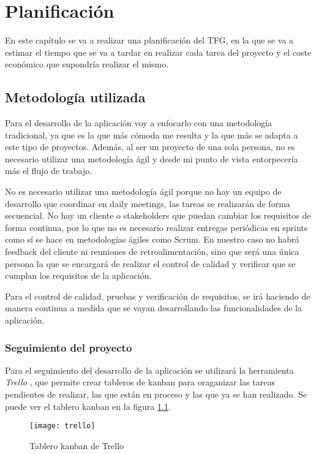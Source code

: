 \chapter{Planificación}
En este capítulo se va a realizar una planificación del TFG, en la que se
va a estimar el tiempo que se va a tardar en realizar cada tarea del proyecto
y el coste económico que supondría realizar el mismo.

\section{Metodología utilizada}
Para el desarrollo de la aplicación voy a enfocarlo con una metodología
tradicional, ya que es la que más cómoda me resulta y la que más se adapta
a este tipo de proyectos. Además, al ser un proyecto de una sola persona, no es
necesario utilizar una metodología ágil y desde mi punto de vista entorpecería
más el flujo de trabajo.

No es necesario utilizar una metodología ágil porque no hay un equipo de
desarrollo que coordinar en daily meetings, las tareas se realizarán de forma secuencial.
No hay un cliente o stakeholders que puedan cambiar los requisitos de forma
continua, por lo que no es necesario realizar entregas periódicas en sprints como
sí se hace en metodologías ágiles como Scrum. En nuestro caso no habrá feedback del
cliente ni reuniones de retroalimentación, sino que será una única persona la que
se encargará de realizar el control de calidad y verificar que se cumplan los
requisitos de la aplicación.

Para el control de calidad, pruebas y verificación de requisitos, se irá haciendo
de manera continua a medida que se vayan desarrollando las funcionalidades de la
aplicación.

\subsection{Seguimiento del proyecto}
Para el seguimiento del desarrollo de la aplicación se utilizará la herramienta
\textit{Trello} \cite{trello}, que permite crear tableros de kanban para oraganizar
las tareas pendientes de realizar, las que están en proceso y las que ya se han
realizado. Se puede ver el tablero kanban en la figura \ref{fig:trello}.

\begin{figure}[H]
  \centering
  \texttt{[image: trello]}
  \caption{Tablero kanban de Trello}
  \label{fig:trello}
\end{figure}

